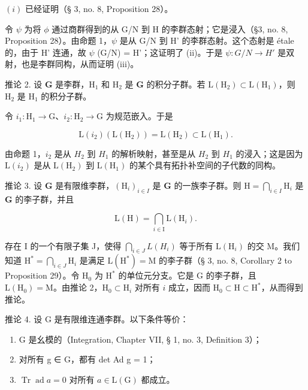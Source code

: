 \((i)\) 已经证明（§ 3, no. 8, Proposition 28）。

令 \(\psi\) 为将 \(\phi\) 通过商群得到的从 G/N 到 H 的李群态射；它是浸入（§3, no. 8, Proposition 28）。由命题 1，\(\psi\) 是从 G/N 到 H' 的李群态射。这个态射是 étale 的，由于 H' 连通，故 \(\psi\) (G/N) = H'；这证明了 (ii)。于是 \(\psi\colon G/N \to H'\) 是双射，也是李群同构，从而证明 (iii)。

推论 2. 设 \(\mathbf{G}\) 是李群，\(\mathrm{H}_1\) 和 \(\mathrm{H}_2\) 是 \(\mathbf{G}\) 的积分子群。若 \(\mathrm{L}(\mathrm{H}_2) \subset \mathrm{L}(\mathrm{H}_1)\)，则 \(\mathrm{H}_2\) 是 \(\mathrm{H}_1\) 的积分子群。

令 \(i_1: \mathrm{H}_1 \to \mathrm{G}\)、\(i_2: \mathrm{H}_2 \to \mathrm{G}\) 为规范嵌入。于是

\[
\mathrm{L} (i _ {2}) (\mathrm{L} (\mathrm{H} _ {2})) = \mathrm{L} (\mathrm{H} _ {2}) \subset \mathrm{L} (\mathrm{H} _ {1}).
\]

由命题 1，\(i_{2}\) 是从 \(H_{2}\) 到 \(H_{1}\) 的解析映射，甚至是从 \(H_{2}\) 到 \(H_{1}\) 的浸入；这是因为 \(\mathrm{L}(i_{2})\) 是从 \(\mathrm{L}(\mathrm{H}_{2})\) 到 \(\mathrm{L}(\mathrm{H}_{1})\) 的某个具有拓扑补空间的子代数的同构。

推论 3. 设 \(\mathbf{G}\) 是有限维李群，\((\mathrm{H}_i)_{i\in I}\) 是 \(\mathbf{G}\) 的一族李子群。则 \(\mathrm{H} = \bigcap_{i\in I}\mathrm{H}_i\) 是 \(\mathbf{G}\) 的李子群，并且

\[
\mathrm{L} (\mathrm{H}) = \bigcap_ {i \in \mathrm{I}} \mathrm{L} (\mathrm{H} _ {i}).
\]

存在 I 的一个有限子集 J，使得 \(\bigcap_{i\in J}L(H_i)\) 等于所有 \(\mathrm{L}(\mathrm{H}_i)\) 的交 M。我们知道 \(\mathrm{H}^* = \bigcap_{i\in J}\mathrm{H}_i\) 是满足 \(\mathrm{L}(\mathrm{H}^*) = \mathrm{M}\) 的李子群（§ 3, no. 8, Corollary 2 to Proposition 29）。令 \(\mathrm{H}_0\) 为 \(\mathrm{H}^*\) 的单位元分支。它是 G 的李子群，且 \(\mathrm{L}(\mathrm{H}_0) = \mathrm{M}\)。由推论 2，\(\mathrm{H}_0\subset \mathrm{H}_i\) 对所有 \(i\) 成立，因而 \(\mathrm{H}_0\subset \mathrm{H}\subset \mathrm{H}^*\)，从而得到推论。

推论 4. 设 G 是有限维连通李群。以下条件等价：

\begin{enumerate}
\def\labelenumi{(\roman{enumi})}
\item
  G 是幺模的（Integration, Chapter VII, § 1, no. 3, Definition 3）；
\item
  对所有 g ∈ G，都有 det Ad g = 1；
\item
  \(\operatorname{Tr} \operatorname{ad} a = 0\) 对所有 \(a \in \mathrm{L}(\mathrm{G})\) 都成立。
\end{enumerate}

